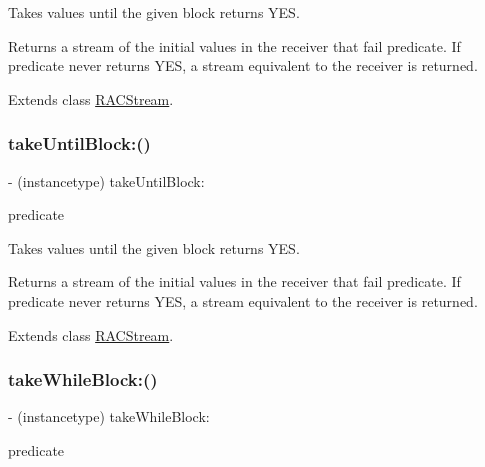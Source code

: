 Takes values until the given block returns {\ttfamily Y\+ES}.

Returns a stream of the initial values in the receiver that fail {\ttfamily predicate}. If {\ttfamily predicate} never returns {\ttfamily Y\+ES}, a stream equivalent to the receiver is returned. 

Extends class \mbox{\hyperlink{interface_r_a_c_stream_ac19d57150840e93112646eef310c2489}{R\+A\+C\+Stream}}.

\mbox{\label{category_r_a_c_stream_07_operations_08_ac19d57150840e93112646eef310c2489}} 
\subsubsection{\texorpdfstring{take\+Until\+Block\+:()}{takeUntilBlock:()}\hspace{0.1cm}{\footnotesize\ttfamily [3/3]}}
{\footnotesize\ttfamily -\/ (instancetype) take\+Until\+Block\+: \begin{DoxyParamCaption}\item[{(B\+O\+OL($^\wedge$)(id x))}]{predicate }\end{DoxyParamCaption}}

Takes values until the given block returns {\ttfamily Y\+ES}.

Returns a stream of the initial values in the receiver that fail {\ttfamily predicate}. If {\ttfamily predicate} never returns {\ttfamily Y\+ES}, a stream equivalent to the receiver is returned. 

Extends class \mbox{\hyperlink{interface_r_a_c_stream_ac19d57150840e93112646eef310c2489}{R\+A\+C\+Stream}}.

\mbox{\label{category_r_a_c_stream_07_operations_08_ae3b27f126fffcf5dfb8eaa6bd71c5fc4}} 
\subsubsection{\texorpdfstring{take\+While\+Block\+:()}{takeWhileBlock:()}\hspace{0.1cm}{\footnotesize\ttfamily [1/3]}}
{\footnotesize\ttfamily -\/ (instancetype) take\+While\+Block\+: \begin{DoxyParamCaption}\item[{(B\+O\+OL($^\wedge$)(id x))}]{predicate }\end{DoxyParamCaption}}

